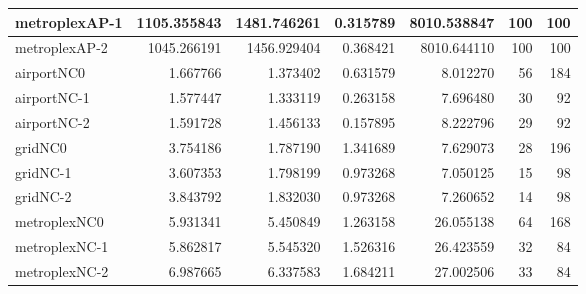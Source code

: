 \begin{longtable}{|l|r|r|r|r|r|r|}
metroplexAP-1 & 1105.355843 & 1481.746261 & 0.315789 & 8010.538847 & 100 & 100 \\ \hline
metroplexAP-2 & 1045.266191 & 1456.929404 & 0.368421 & 8010.644110 & 100 & 100 \\ \hline
airportNC0 & 1.667766 & 1.373402 & 0.631579 & 8.012270 & 56 & 184 \\ \hline
airportNC-1 & 1.577447 & 1.333119 & 0.263158 & 7.696480 & 30 & 92 \\ \hline
airportNC-2 & 1.591728 & 1.456133 & 0.157895 & 8.222796 & 29 & 92 \\ \hline
gridNC0 & 3.754186 & 1.787190 & 1.341689 & 7.629073 & 28 & 196 \\ \hline
gridNC-1 & 3.607353 & 1.798199 & 0.973268 & 7.050125 & 15 & 98 \\ \hline
gridNC-2 & 3.843792 & 1.832030 & 0.973268 & 7.260652 & 14 & 98 \\ \hline
metroplexNC0 & 5.931341 & 5.450849 & 1.263158 & 26.055138 & 64 & 168 \\ \hline
metroplexNC-1 & 5.862817 & 5.545320 & 1.526316 & 26.423559 & 32 & 84 \\ \hline
metroplexNC-2 & 6.987665 & 6.337583 & 1.684211 & 27.002506 & 33 & 84 \\ \hline
\end{longtable}
